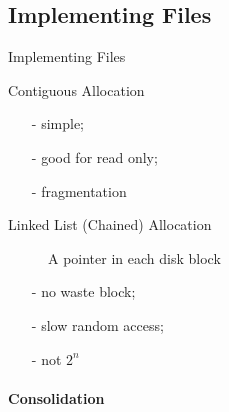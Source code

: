 \subsection{Implementing Files}

\begin{frame}{Implementing Files}
  \begin{description}
  \item[Contiguous Allocation] 
  \end{description}
    \begin{center}
       
    \end{center}
  \begin{multicols}{2}
    \begin{itemize}
    \item[-] simple;
    \item[-] good for read only;
    \item[-] fragmentation
    \end{itemize}
  \end{multicols}
\end{frame}

\begin{frame}
  \begin{description}
  \item[Linked List (Chained) Allocation] A pointer in each disk block
  \end{description}
  \begin{center}
     
  \end{center}
  \begin{multicols}{3}
    \begin{itemize}
    \item[-] no waste block;
    \item[-] slow random access;
    \item[-] not $2^n$
    \end{itemize}
  \end{multicols}
\end{frame}

\paragraph{Consolidation}

